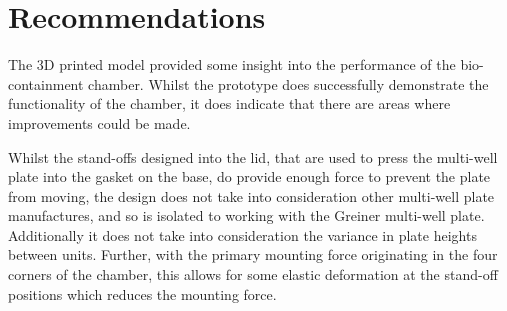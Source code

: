 \documentclass[class=report,11pt,crop=false]{standalone}
\begin{document}
\section{Recommendations}
The 3D printed model provided some insight into the performance of the bio-containment chamber. Whilst the prototype does successfully demonstrate the functionality of the chamber, it does indicate that there are areas where improvements could be made.

Whilst the stand-offs designed into the lid, that are used to press the multi-well plate into the gasket on the base, do provide enough force to prevent the plate from moving, the design does not take into consideration other multi-well plate manufactures, and so is isolated to working with the Greiner multi-well plate. Additionally it does not take into consideration the variance in plate heights between units. Further, with the primary mounting force originating in the four corners of the chamber, this allows for some elastic deformation at the stand-off positions which reduces the mounting force. 

\ifstandalone

\fi
\end{document}
